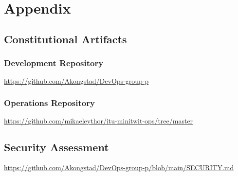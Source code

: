 \section{Appendix}
\label{app}

\subsection{Constitutional Artifacts}
\label{app:constArts}

\subsubsection{Development Repository}
\label{app:devRepo}
\href{https://github.com/Akongstad/DevOps-group-p}{https://github.com/Akongstad/DevOps-group-p}

\subsubsection{Operations Repository}
\label{app:opsRepo}
\href{https://github.com/mikaeleythor/itu-minitwit-ops/tree/master}{https://github.com/mikaeleythor/itu-minitwit-ops/tree/master}

\subsection{Security Assessment}
\label{app:secAss}
\href{https://github.com/Akongstad/DevOps-group-p/blob/main/SECURITY.md}{https://github.com/Akongstad/DevOps-group-p/blob/main/SECURITY.md}

